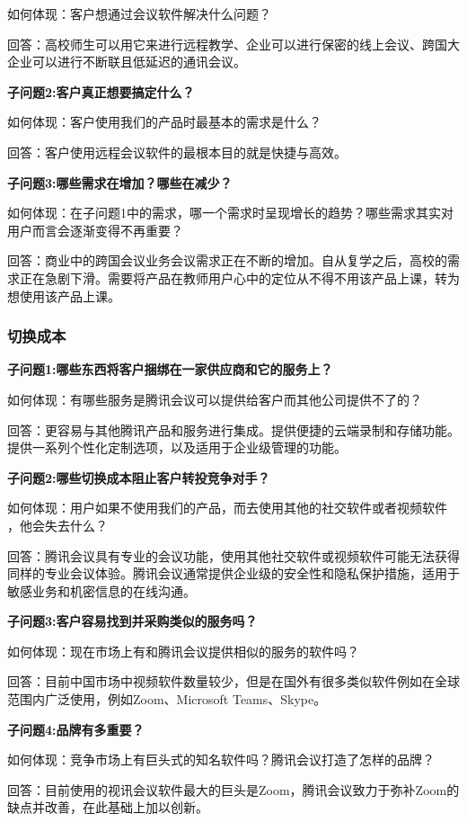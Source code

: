 \documentclass[a4paper,12pt]{article}
\begin{document}
    如何体现：客户想通过会议软件解决什么问题？

    回答：⾼校师⽣可以⽤它来进⾏远程教学、企业可以进⾏保密的线上会议、跨国⼤企业可以进⾏不断联且低延迟的通讯会议。
    
    \textbf{子问题2:客户真正想要搞定什么？}

    如何体现：客户使⽤我们的产品时最基本的需求是什么？

    回答：客户使⽤远程会议软件的最根本⽬的就是快捷与⾼效。

    \textbf{子问题3:哪些需求在增加？哪些在减少？}

    如何体现：在⼦问题1中的需求，哪⼀个需求时呈现增⻓的趋势？哪些需求其实对⽤户⽽⾔会逐渐变得不再重要？

    回答：商业中的跨国会议业务会议需求正在不断的增加。⾃从复学之后，⾼校的需求正在急剧下滑。需要将产品在教师⽤户⼼中的定位从不得不⽤该产品上课，转为想使⽤该产品上课。
    
    \subsubsection{切换成本}
    \textbf{子问题1:哪些东西将客户捆绑在一家供应商和它的服务上？}

    如何体现：有哪些服务是腾讯会议可以提供给客户⽽其他公司提供不了的？

    回答：更容易与其他腾讯产品和服务进行集成。提供便捷的云端录制和存储功能。提供一系列个性化定制选项，以及适用于企业级管理的功能。

    \textbf{子问题2:哪些切换成本阻止客户转投竞争对手？}

    如何体现：⽤户如果不使⽤我们的产品，⽽去使⽤其他的社交软件或者视频软件 ，他会失去什么？

    回答：腾讯会议具有专业的会议功能，使用其他社交软件或视频软件可能无法获得同样的专业会议体验。腾讯会议通常提供企业级的安全性和隐私保护措施，适用于敏感业务和机密信息的在线沟通。

    \textbf{子问题3:客户容易找到并采购类似的服务吗？}

    如何体现：现在市场上有和腾讯会议提供相似的服务的软件吗？

    回答：目前中国市场中视频软件数量较少，但是在国外有很多类似软件例如在全球范围内广泛使用，例如Zoom、Microsoft Teams、Skype。

    \textbf{子问题4:品牌有多重要？}

    如何体现：竞争市场上有巨头式的知名软件吗？腾讯会议打造了怎样的品牌？

    回答：⽬前使⽤的视讯会议软件最⼤的巨头是Zoom，腾讯会议致⼒于弥补Zoom的缺点并改善，在此基础上加以创新。
\end{document}
